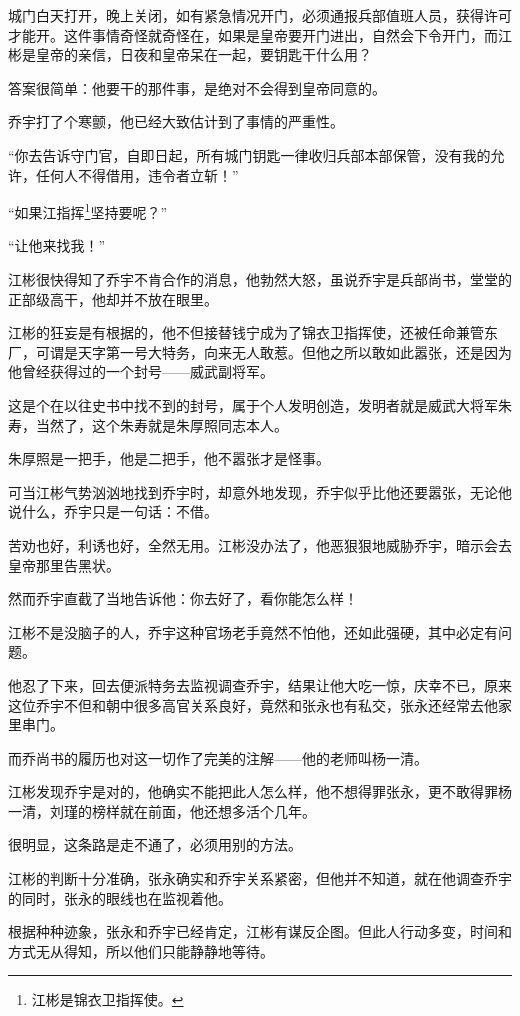\begin{multicols}{\theparacolNo}
城门白天打开，晚上关闭，如有紧急情况开门，必须通报兵部值班人员，获得许可才能开。这件事情奇怪就奇怪在，如果是皇帝要开门进出，自然会下令开门，而江彬是皇帝的亲信，日夜和皇帝呆在一起，要钥匙干什么用？

答案很简单：他要干的那件事，是绝对不会得到皇帝同意的。

乔宇打了个寒颤，他已经大致估计到了事情的严重性。

“你去告诉守门官，自即日起，所有城门钥匙一律收归兵部本部保管，没有我的允许，任何人不得借用，违令者立斩！”

“如果江指挥\footnote{江彬是锦衣卫指挥使。}坚持要呢？”

“让他来找我！”

江彬很快得知了乔宇不肯合作的消息，他勃然大怒，虽说乔宇是兵部尚书，堂堂的正部级高干，他却并不放在眼里。

江彬的狂妄是有根据的，他不但接替钱宁成为了锦衣卫指挥使，还被任命兼管东厂，可谓是天字第一号大特务，向来无人敢惹。但他之所以敢如此嚣张，还是因为他曾经获得过的一个封号——威武副将军。

这是个在以往史书中找不到的封号，属于个人发明创造，发明者就是威武大将军朱寿，当然了，这个朱寿就是朱厚照同志本人。

朱厚照是一把手，他是二把手，他不嚣张才是怪事。

可当江彬气势汹汹地找到乔宇时，却意外地发现，乔宇似乎比他还要嚣张，无论他说什么，乔宇只是一句话：不借。

苦劝也好，利诱也好，全然无用。江彬没办法了，他恶狠狠地威胁乔宇，暗示会去皇帝那里告黑状。

然而乔宇直截了当地告诉他：你去好了，看你能怎么样！

江彬不是没脑子的人，乔宇这种官场老手竟然不怕他，还如此强硬，其中必定有问题。

他忍了下来，回去便派特务去监视调查乔宇，结果让他大吃一惊，庆幸不已，原来这位乔宇不但和朝中很多高官关系良好，竟然和张永也有私交，张永还经常去他家里串门。

而乔尚书的履历也对这一切作了完美的注解——他的老师叫杨一清。

江彬发现乔宇是对的，他确实不能把此人怎么样，他不想得罪张永，更不敢得罪杨一清，刘瑾的榜样就在前面，他还想多活个几年。

很明显，这条路是走不通了，必须用别的方法。

江彬的判断十分准确，张永确实和乔宇关系紧密，但他并不知道，就在他调查乔宇的同时，张永的眼线也在监视着他。

根据种种迹象，张永和乔宇已经肯定，江彬有谋反企图。但此人行动多变，时间和方式无从得知，所以他们只能静静地等待。


\end{multicols}
